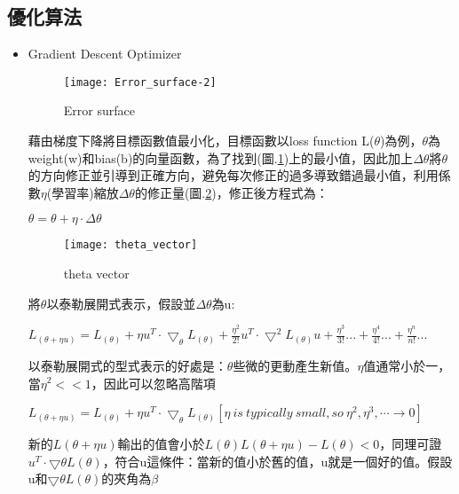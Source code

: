 \subsection{優化算法}
\renewcommand{\baselinestretch}{1}
\begin{itemize}
\item Gradient Descent Optimizer
\begin{figure}
\begin{center}
\texttt{[image: Error\_surface-2]}
\caption{\Large Error surface}
\label{Error_surface-2}
\end{center}
\end{figure}
\newpage
\fontsize{14pt}{28pt}\selectfont
 藉由梯度下降將目標函數值最小化，目標函數以loss function L($\theta$)為例，$\theta$為weight(w)和bias(b)的向量函數，為了找到(圖.\ref{Error_surface-2})上的最小值，因此加上$\Delta\theta$將$\theta$ 的方向修正並引導到正確方向，避免每次修正的過多導致錯過最小值，利用係數$\eta$(學習率)縮放$\Delta\theta$的修正量(圖.\ref{theta_vector})，修正後方程式為：\\
\begin{center}
$\theta=\theta+\eta\cdot\Delta\theta$\\
\end{center}
\begin{figure}
\begin{center}
\texttt{[image: theta\_vector]}
\caption{\Large theta vector}
\label{theta_vector}
\end{center}
\end{figure}
\newpage
將$\theta$以泰勒展開式表示，假設並$\Delta\theta$為u:
\begin{center}
$L_{(\theta+\eta u)}=L_{(\theta)}+\eta u^{T}\cdot\bigtriangledown_{\theta} L_{(\theta)}+\frac{\eta^2}{2!}u^T\cdot\bigtriangledown^2 L_{(\theta)}u+\frac{\eta^3}{3!}...+\frac{\eta^4}{4!}...+\frac{\eta^n}{n!}...$\\
\end{center}
以泰勒展開式的型式表示的好處是：$\theta$些微的更動產生新值。$\eta$值通常小於一，當$\eta^2 << 1$，因此可以忽略高階項 
\begin{center}
$L_{(\theta+\eta u)}=L_{(\theta)}+\eta u^{T}\cdot\bigtriangledown_{\theta} L_{(\theta)} [\eta\ is\ typically\ small, so\ \eta^2, \eta^3,\cdots \rightarrow 0]$\\
\end{center}
新的$L(\theta + \eta u)$輸出的值會小於$L(\theta) L(\theta+\eta u) − L(\theta) < 0$，同理可證$u^T\cdot\bigtriangledown\theta L(\theta)$，符合u這條件：當新的值小於舊的值，u就是一個好的值。假設u和$\bigtriangledown\theta L(\theta)$的夾角為$\beta$\\

\end{itemize}
